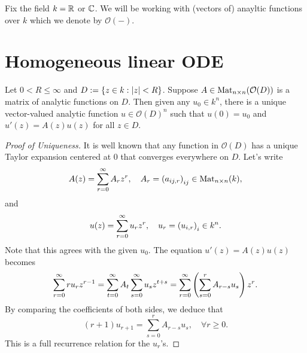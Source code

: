 \documentclass{article}
\begin{document}
\self

Fix the field $k=\mathbb{R}$ or $\mathbb{C}$. We will be working with (vectors of) anayltic functions over $k$ which we denote by $\mathcal{O}(-)$.

\section{Homogeneous linear ODE}

\begin{theorem}[Cauchy]
    Let $0<R\leq\infty$ and $D:=\left\{z\in k:\left\vert z\right\vert<R\right\}$. Suppose $A\in\operatorname{Mat}_{n\times n}(\mathcal{O}(D))$ is a matrix of analytic functions on $D$. Then given any $u_0\in k^n$, there is a unique vector-valued analytic function $u\in\mathcal{O}(D)^n$ such that $u(0)=u_0$ and $u'(z)=A(z)u(z)$ for all $z\in D$.
\end{theorem}

\begin{proof}[Proof of Uniqueness]
    It is well known that any function in $\mathcal{O}(D)$ has a unique Taylor expansion centered at $0$ that converges everywhere on $D$. Let's write
    \[
        A(z)=\sum_{r=0}^\infty A_r z^r,\quad A_r=\left(a_{ij,r}\right)_{ij}\in\operatorname{Mat}_{n\times n}(k),
    \]
    and
    \[
        u(z)=\sum_{r=0}^\infty u_r z^r,\quad u_r=\left(u_{i,r}\right)_i\in k^n.
    \]
    Note that this agrees with the given $u_0$. The equation $u'(z)=A(z)u(z)$ becomes
    \[
        \sum_{r=0}^\infty r u_r z^{r-1}
        =\sum_{t=0}^\infty A_t\sum_{s=0}^\infty u_s z^{t+s}
        =\sum_{r=0}^\infty \left(\sum_{s=0}^r A_{r-s} u_{s}\right) z^r.
    \]
    By comparing the coefficients of both sides, we deduce that
    \begin{equation}\label{eq:u}
        (r+1) u_{r+1}=\sum_{s=0}^r A_{r-s} u_s,\quad\forall r\geq 0.
    \end{equation}
    This is a full recurrence relation for the $u_r$'s.
\end{proof}
\end{document}
